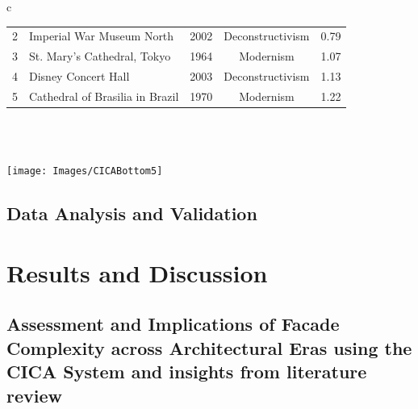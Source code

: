 \begin{linenumbers}
\begin{table}[htb]
\begin{tabular}{c}
\begin{minipage}{\textwidth}
\begin{tabularx}{\linewidth}{c X c c c}
        2 & Imperial War Museum North & 2002 & Deconstructivism & 0.79 \\
        3 & St. Mary's Cathedral, Tokyo & 1964 & Modernism & 1.07 \\
        4 & Disney Concert Hall & 2003 & Deconstructivism & 1.13 \\
        5 & Cathedral of Brasilia in Brazil & 1970 & Modernism & 1.22 \\
        \bottomrule
        \end{tabularx}
    \end{minipage}
    \\
    \\
    \begin{minipage}{\textwidth}
        \centering
        \texttt{[image: Images/CICABottom5]}
        \label{fig:CICABottom5scores}
    \end{minipage}
\end{tabular}
\end{table}

\subsection{Data Analysis and Validation}
\label{subsec:Data_analysis}



\section{Results and Discussion}
\label{sec:Results}




\subsection{Assessment and Implications of Facade Complexity across Architectural Eras using the CICA System and insights from literature review}
\label{subsec:ResultsComplexityImageAnalysishistory}





\end{linenumbers}
